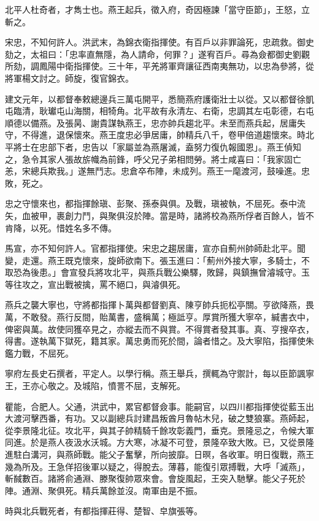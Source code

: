\begin{pinyinscope}
北平人杜奇者，才雋士也。燕王起兵，徵入府，奇因極諫「當守臣節」，王怒，立斬之。

宋忠，不知何許人。洪武末，為錦衣衛指揮使。有百戶以非罪論死，忠疏救。御史劾之，太祖曰：「忠率直無隱，為人請命，何罪？」遂宥百戶。尋為僉都御史劉觀所劾，調鳳陽中衛指揮使。三十年，平羌將軍齊讓征西南夷無功，以忠為參將，從將軍楊文討之。師旋，復官錦衣。

建文元年，以都督奉敕總邊兵三萬屯開平，悉簡燕府護衛壯士以從。又以都督徐凱屯臨清，耿瓛屯山海關，相犄角。北平故有永清左、右衛，忠調其左屯彰德，右屯順德以備燕。及張昺、謝貴謀執燕王，忠亦帥兵趨北平。未至而燕兵起，居庸失守，不得進，退保懷來。燕王度忠必爭居庸，帥精兵八千，卷甲倍道趨懷來。時北平將士在忠部下者，忠告以「家屬並為燕屠滅，盍努力復仇報國恩」。燕王偵知之，急令其家人張故旂幟為前鋒，呼父兄子弟相問勞。將士咸喜曰：「我家固亡恙，宋總兵欺我。」遂無鬥志。忠倉卒布陣，未成列。燕王一麾渡河，鼓噪進。忠敗，死之。

忠之守懷來也，都指揮餘瑱、彭聚、孫泰與俱。及戰，瑱被執，不屈死。泰中流矢，血被甲，裹創力鬥，與聚俱沒於陣。當是時，諸將校為燕所俘者百餘人，皆不肯降，以死。惜姓名多不傳。

馬宣，亦不知何許人。官都指揮使。宋忠之趨居庸，宣亦自薊州帥師赴北平。聞變，走還。燕王既克懷來，旋師欲南下。張玉進曰：「薊州外接大寧，多騎士，不取恐為後患。」會宣發兵將攻北平，與燕兵戰公樂驛，敗歸，與鎮撫曾濬城守。玉等往攻之，宣出戰被擒，罵不絕口，與濬俱死。

燕兵之襲大寧也，守將都指揮卜萬與都督劉真、陳亨帥兵扼松亭關。亨欲降燕，畏萬，不敢發。燕行反間，貽萬書，盛稱萬；極詆亨。厚賞所獲大寧卒，緘書衣中，俾密與萬。故使同獲卒見之，亦縱去而不與賞。不得賞者發其事。真、亨搜卒衣，得書。遂執萬下獄死，籍其家。萬忠勇而死於間，論者惜之。及大寧陷，指揮使朱鑑力戰，不屈死。

寧府左長史石撰者，平定人。以學行稱。燕王舉兵，撰輒為守禦計，每以臣節諷寧王，王亦心敬之。及城陷，憤詈不屈，支解死。

瞿能，合肥人。父通，洪武中，累官都督僉事。能嗣官，以四川都指揮使從藍玉出大渡河擊西番，有功。又以副總兵討建昌叛酋月魯帖木兒，破之雙狼寨。燕師起，從李景隆北征。攻北平，與其子帥精騎千餘攻彰義門，垂克。景隆忌之，令候大軍同進。於是燕人夜汲水沃城。方大寒，冰凝不可登，景隆卒致大敗。已，又從景隆進駐白溝河，與燕師戰。能父子奮擊，所向披靡。日暝，各收軍。明日復戰，燕王幾為所及。王急佯招後軍以疑之，得脫去。薄暮，能復引眾搏戰，大呼「滅燕」，斬馘數百。諸將俞通淵、滕聚復帥眾來會。會旋風起，王突入馳擊。能父子死於陣。通淵、聚俱死。精兵萬餘並沒。南軍由是不振。

時與北兵戰死者，有都指揮莊得、楚智、皁旗張等。


\end{pinyinscope}
